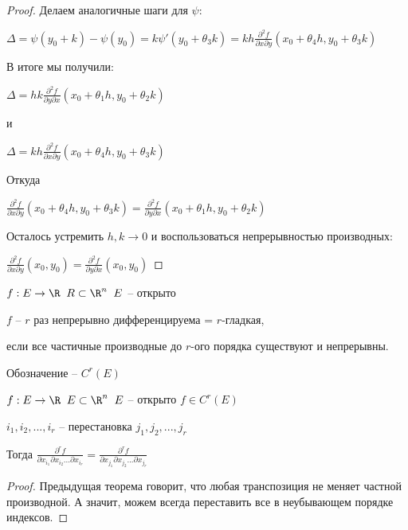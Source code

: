 \begin{proof}
	Делаем аналогичные шаги для $\psi$:
	
	$\Delta = \psi(y_0 + k) - \psi(y_0) = k\psi'(y_0 + \theta_3 k) = kh\frac{\partial^2 f}{\partial x \partial y}(x_0 + \theta_4 h, y_0 + \theta_3 k) $
	
	В итоге мы получили:

	$\Delta = hk \frac{\partial^2 f}{\partial y \partial x} (x_0 + \theta_1 h, y_0 + \theta_2 k)$

	и

	$\Delta = kh\frac{\partial^2 f}{\partial x \partial y}(x_0 + \theta_4 h, y_0 + \theta_3 k)$
	
	Откуда
	
	$\frac{\partial^2 f}{\partial x \partial y} (x_0 + \theta_4 h, y_0 + \theta_3 k) = \frac{\partial^2 f}{\partial y \partial x} (x_0 + \theta_1 h, y_0 + \theta_2 k) $

	Осталось устремить $h,k\to 0$ и воспользоваться непрерывностью производных:
	
	$\frac{\partial^2 f}{\partial x \partial y} (x_0, y_0) =\frac{\partial^2 f}{\partial y \partial x} (x_0, y_0) $
	
	
\end{proof}

\begin{definition}\slashns
	
	$f: E \to \R \;\; R\subset \R^n \;\; E$ -- открыто
	
	$f$ -- $r$ раз непрерывно дифференцируема = $r$-гладкая,
	
	если все частичные производные до $r$-ого порядка существуют и непрерывны.
	
	Обозначение -- $C^r(E)$
\end{definition}

\begin{theorem}\slashns
	
	$f: E \to \R \;\; E \subset \R^n \;\; E$ -- открыто $f \in C^r(E)$
	
	$i_1, i_2, ...,i_r$ -- перестановка $j_1, j_2, ... , j_r$
	
	Тогда $\frac{\partial^r f}{\partial x_{i_1} \partial x_{i_2}...\partial x_{i_r}  } = \frac{\partial^r f}{\partial x_{j_1} \partial x_{j_2}...\partial x_{j_r}  }$
\end{theorem}

\begin{proof}\slashns
	
	Предыдущая теорема говорит, что любая транспозиция не меняет частной производной. А значит, можем всегда переставить все в неубывающем порядке индексов.
\end{proof}

